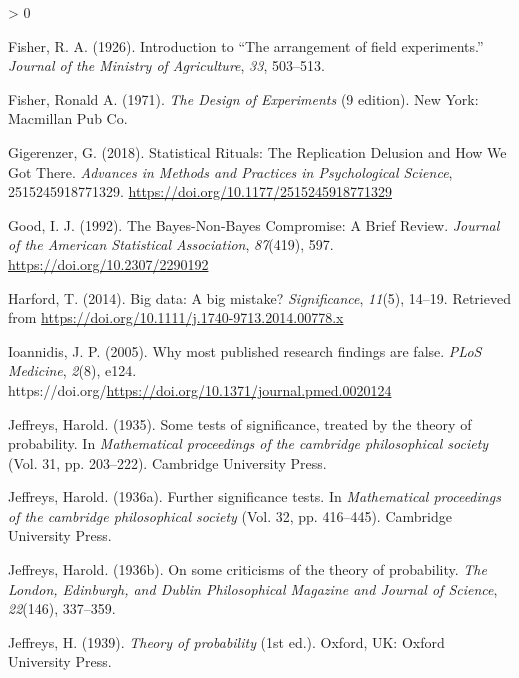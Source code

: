 \documentclass[
  english,
  ,man, a4paper,floatsintext]{apa6}
\newlength{\cslhangindent}
\newenvironment{CSLReferences}[2] %
 {%
  \setlength{\parindent}{0pt}
  \ifodd #1 \everypar{\setlength{\hangindent}{\cslhangindent}}\ignorespaces\fi
  \ifnum #2 > 0
  \setlength{\parskip}{#2\baselineskip}
  \fi
 }%
 {}
\begin{document}
\begin{CSLReferences}{1}{0}
\leavevmode\hypertarget{ref-fisher_introduction_1926}{}%
Fisher, R. A. (1926). Introduction to {``{The} arrangement of field experiments.''} \emph{Journal of the Ministry of Agriculture}, \emph{33}, 503--513.

\leavevmode\hypertarget{ref-fisher_design_1971}{}%
Fisher, Ronald A. (1971). \emph{The {Design} of {Experiments}} (9 edition). New York: Macmillan Pub Co.

\leavevmode\hypertarget{ref-gigerenzer_statistical_2018}{}%
Gigerenzer, G. (2018). Statistical {Rituals}: {The Replication Delusion} and {How We Got There}. \emph{Advances in Methods and Practices in Psychological Science}, 2515245918771329. \url{https://doi.org/10.1177/2515245918771329}

\leavevmode\hypertarget{ref-good_bayes-non-bayes_1992}{}%
Good, I. J. (1992). The {Bayes}-{Non}-{Bayes Compromise}: {A Brief Review}. \emph{Journal of the American Statistical Association}, \emph{87}(419), 597. \url{https://doi.org/10.2307/2290192}

\leavevmode\hypertarget{ref-harford2014big}{}%
Harford, T. (2014). Big data: A big mistake? \emph{Significance}, \emph{11}(5), 14--19. Retrieved from \url{https://doi.org/10.1111/j.1740-9713.2014.00778.x}

\leavevmode\hypertarget{ref-ioannidis2005most}{}%
Ioannidis, J. P. (2005). Why most published research findings are false. \emph{PLoS Medicine}, \emph{2}(8), e124. https://doi.org/\url{https://doi.org/10.1371/journal.pmed.0020124}

\leavevmode\hypertarget{ref-jeffreys1935some}{}%
Jeffreys, Harold. (1935). Some tests of significance, treated by the theory of probability. In \emph{Mathematical proceedings of the cambridge philosophical society} (Vol. 31, pp. 203--222). Cambridge University Press.

\leavevmode\hypertarget{ref-jeffreys1936further}{}%
Jeffreys, Harold. (1936a). Further significance tests. In \emph{Mathematical proceedings of the cambridge philosophical society} (Vol. 32, pp. 416--445). Cambridge University Press.

\leavevmode\hypertarget{ref-jeffreys1936on}{}%
Jeffreys, Harold. (1936b). On some criticisms of the theory of probability. \emph{The London, Edinburgh, and Dublin Philosophical Magazine and Journal of Science}, \emph{22}(146), 337--359.

\leavevmode\hypertarget{ref-Jeffreys1939}{}%
Jeffreys, H. (1939). \emph{Theory of probability} (1st ed.). Oxford, UK: Oxford University Press.


\end{CSLReferences}
\end{document}
